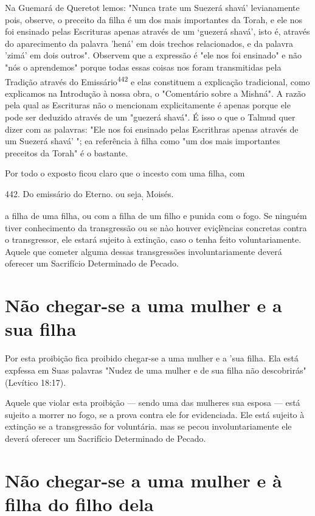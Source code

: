 \begin{itemize}
\begin{enumrate}
\begin{itemize}
\begin{itemize}
\begin{itemize}
Na Guemará de Queretot lemos: "Nunca trate um Suezerá shavá'
levianamente pois, observe, o preceito da filha é um dos mais
importantes da Torah, e ele nos foi ensinado pelas Escrituras apenas
através de um `guezerá shavá', isto é, através do aparecimento da
palavra 'hená' em dois trechos rela­cionados, e da palavra 'zimá' em
dois outros". Observem que a expressão é "ele nos foi ensinado" e não
"nós o aprendemos" porque todas essas coisas nos foram transmitidas pela
Tradição através do Emissário\textsuperscript{442} e elas constituem a
explicação tradicional, como explicamos na Introdução à nossa obra, o
"Co­mentário sobre a Mishná". A razão pela qual as Escrituras não o
mencionam explicitamente é apenas porque ele pode ser deduzido através
de um "guezerá shavá". É isso o que o Talmud quer dizer com as palavras:
"Ele nos foi ensina­do pelas Escrithras apenas através de um Suezerá
shavá' "; ea referência à filha como "um dos mais importantes preceitos
da Torah" é o bastante.


Por todo o exposto ficou claro que o incesto com uma filha, com


442. Do emissário do Eterno. ou seja\textsubscript{;} Moisés.

a filha de uma filha, ou com a filha de um filho e punida com o fogo. Se
nin­guém tiver conhecimento da transgressão ou se nào houver eviçlèncias
concre­tas contra o transgressor, ele estará sujeito à extinção, caso o
tenha feito volun­tariamente. Aquele que cometer alguma dessas
transgressões involuntariamen­te deverá oferecer um Sacrifício
Determinado de Pecado.

\section{Não chegar-se a uma mulher e a sua filha}

Por esta proibição fica proibido chegar-se a uma mulher e a 'sua fi­lha.
Ela está expfessa em Suas palavras "Nudez de uma mulher e de sua filha
não descobrirás" (Levítico 18:17).

Aquele que violar esta proibição --- sendo uma das mulheres sua es­posa
--- está sujeito a morrer no fogo, se a prova contra ele for
evidenciada. Ele está sujeito à extinção se a transgressão for
voluntária. mas se pecou invo­luntariamente ele deverá oferecer um
Sacrifício Determinado de Pecado.

\section{Não chegar-se a uma mulher e à filha do filho dela}


\end{itemize}
\end{itemize}
\end{itemize}
\end{enumrate}
\end{itemize}
